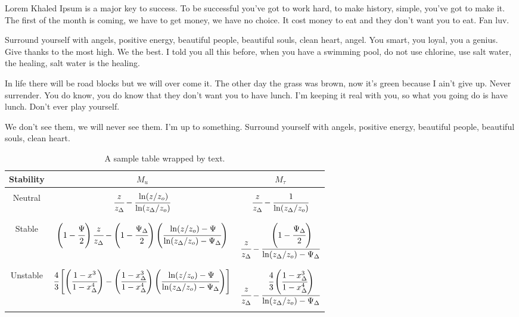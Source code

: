 Lorem Khaled Ipsum is a major key to success. To be successful you've got to work hard, to make history, simple, you've got to make it. The first of the month is coming, we have to get money, we have no choice. It cost money to eat and they don't want you to eat. Fan luv. 

Surround yourself with angels, positive energy, beautiful people, beautiful souls, clean heart, angel. You smart, you loyal, you a genius. Give thanks to the most high. We the best. I told you all this before, when you have a swimming pool, do not use chlorine, use salt water, the healing, salt water is the healing.

In life there will be road blocks but we will over come it. The other day the grass was brown, now it's green because I ain't give up. Never surrender. You do know, you do know that they don't want you to have lunch. I'm keeping it real with you, so what you going do is have lunch. Don't ever play yourself. 

We don't see them, we will never see them. I'm up to something. Surround yourself with angels, positive energy, beautiful people, beautiful souls, clean heart.

\begin{wraptable}[15]{r}[0.01in]{4.5in}
\label{table1}
\caption{A sample table wrapped by text.}
\begin{center}
\vspace{-10pt}
\scriptsize
\begin{tabular}{  c  c  c  }
\hline
\hline
Stability & $M_u$ & $M_{\tau}$ \\ 
\hline\hline\\
Neutral & $\cfrac{z}{z_\Delta} - \cfrac{\ln(z/z_o)}{\ln(z_\Delta/z_o)}$ & $\cfrac{z}{z_\Delta} - \cfrac{1}{\ln(z_\Delta/z_o)}$\\\\
\hline \\
Stable & $\left(1 - \cfrac{\Psi}{2}\right)\cfrac{z}{z_\Delta} - \left(1 - \cfrac{\Psi_\Delta}{2}\right)
\left(\cfrac{\ln(z/z_o)-\Psi}{\ln(z_\Delta/z_o)- \Psi_\Delta}\right)$ & $\cfrac{z}{z_\Delta} - \cfrac{\left(1 - \cfrac{\Psi_\Delta}{2}\right)}{\ln(z_\Delta/z_o) - \Psi_\Delta}$\\\\
\hline \\
Unstable & $\cfrac{4}{3}\left[\left(\cfrac{1-x^3}{1-x_{\Delta}^{4}}\right) -  \left(\cfrac{1-x_{\Delta}^3}{1 - x_{\Delta}^{4}}\right)\left(\cfrac{\ln(z/z_o)-\Psi}{\ln(z_\Delta/z_o)- \Psi_\Delta}\right)\right]$ & $\cfrac{z}{z_\Delta} - \cfrac{\cfrac{4}{3}\left(\cfrac{1-x_{\Delta}^3}{1 - x_{\Delta}^{4}}\right)}{\ln(z_\Delta/z_o) - \Psi_\Delta}$\\\\
\hline
\hline
\end{tabular}
\end{center}
\end{wraptable}


